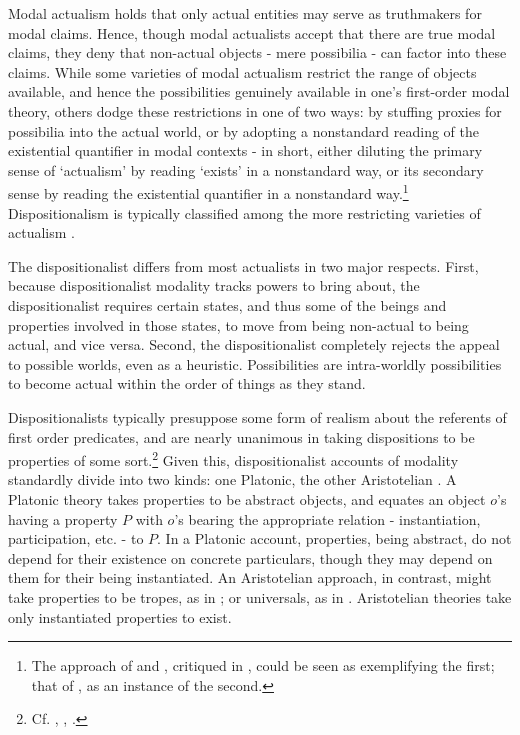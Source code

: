 \documentclass[]{article}
\begin{document}
Modal actualism holds that only actual entities may serve as truthmakers for modal claims. Hence, though modal actualists accept that there are true modal claims, they deny that non-actual objects - mere possibilia - can factor into these claims. While some varieties of modal actualism restrict the range of objects available, and hence the possibilities genuinely available in one's first-order modal theory,  others dodge these restrictions in one of two ways: by stuffing proxies for possibilia into the actual world, or by adopting a nonstandard reading of the existential quantifier in modal contexts - in short, either diluting the primary sense of `actualism' by reading `exists' in a nonstandard way, or its secondary sense by reading the existential quantifier in a nonstandard way.\footnote{The approach of \cite{LinskyZalta1994} and \cite{LinskyZalta1996}, critiqued in \cite{Bennett2006}, could be seen as exemplifying the first; that of \cite{White1985}, as an instance of the second.} Dispositionalism is typically classified among the more restricting varieties of actualism \cite{Contessa2010} \cite{Vetter2011}.

The dispositionalist differs from most actualists in two major respects. First, because dispositionalist modality tracks powers to bring about, the dispositionalist requires certain states, and thus some of the beings and properties involved in those states, to move from being non-actual to being actual, and vice versa. Second, the dispositionalist completely rejects the appeal to possible worlds, even as a heuristic. Possibilities are intra-worldly possibilities to become actual within the order of things as they stand.

Dispositionalists typically presuppose some form of realism about the referents of first order predicates, and are nearly unanimous in taking dispositions to be properties of some sort.\footnote{Cf. \cite{Pruss2002}, \cite{Martin2008}, \cite{Contessa2015}.} Given this, dispositionalist accounts of modality standardly divide into two kinds: one Platonic, the other Aristotelian \cite{Fitch1996} \cite[pp. 234-238]{Jacobs2010}. A Platonic theory takes properties to be abstract objects, and equates an object $o$'s having a property $P$ with $o$'s bearing the appropriate relation - instantiation, participation, etc. - to $P$. In a Platonic account, properties, being abstract, do not depend for their existence on concrete particulars, though they may depend on them for their being instantiated. An Aristotelian approach, in contrast, might take properties to be tropes, as in \cite{Martin2008}; or universals, as in \cite{Armstrong1997}. Aristotelian theories take only instantiated properties to exist.
\end{document}
